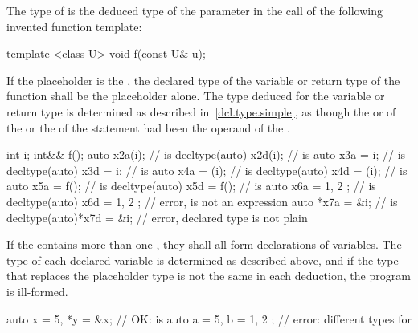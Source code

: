 The type of  is the deduced type of the parameter  in
the call  of the following invented function template:

\begin{codeblock}
template <class U> void f(const U& u);
\end{codeblock}
\exitexample

If the placeholder is the  ,
the declared type of the variable or return type of the function shall be the
placeholder alone. The type deduced for the variable or return type is
determined as described in~\ref{dcl.type.simple}, as though the
 or  of the
 or the  of the
 statement had
been the operand of the . \enterexample
\begin{codeblock}
int i;
int&& f();
auto           x2a(i);         //  is 
decltype(auto) x2d(i);         //  is 
auto           x3a = i;        //  is 
decltype(auto) x3d = i;        //  is 
auto           x4a = (i);      //  is 
decltype(auto) x4d = (i);      //  is 
auto           x5a = f();      //  is 
decltype(auto) x5d = f();      //  is 
auto           x6a = { 1, 2 }; //  is 
decltype(auto) x6d = { 1, 2 }; // error,  is not an expression
auto          *x7a = &i;       //  is 
decltype(auto)*x7d = &i;       // error, declared type is not plain 
\end{codeblock}
\exitexample

\pnum
If the  contains more than one
, they shall all form declarations of
variables. The type of each declared variable is determined as
described above, and if the type that replaces the placeholder type is not the
same in each deduction, the program is ill-formed.

\enterexample
\begin{codeblock}
auto x = 5, *y = &x;        // OK:  is 
auto a = 5, b = { 1, 2 };   // error: different types for 
\end{codeblock}
\exitexample%

